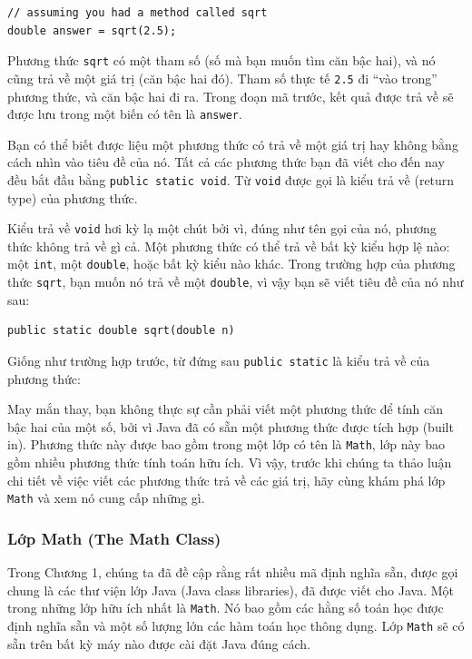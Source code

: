 \begin{verbatim}
// assuming you had a method called sqrt
double answer = sqrt(2.5);
\end{verbatim}

Phương thức \texttt{sqrt} có một tham số (số mà bạn muốn tìm căn bậc
hai), và nó cũng trả về một giá trị (căn bậc hai đó). Tham số thực tế
\texttt{2.5} đi ``vào trong'' phương thức, và căn bậc hai đi ra. Trong
đoạn mã trước, kết quả được trả về sẽ được lưu trong một biến có tên là
\texttt{answer}.

Bạn có thể biết được liệu một phương thức có trả về một giá trị hay
không bằng cách nhìn vào tiêu đề của nó. Tất cả các phương thức bạn đã
viết cho đến nay đều bắt đầu bằng \texttt{public\ static\ void}. Từ
\texttt{void} được gọi là kiểu trả về (return type) của phương thức.

Kiểu trả về \texttt{void} hơi kỳ lạ một chút bởi vì, đúng như tên gọi
của nó, phương thức không trả về gì cả. Một phương thức có thể trả về
bất kỳ kiểu hợp lệ nào: một \texttt{int}, một \texttt{double}, hoặc bất
kỳ kiểu nào khác. Trong trường hợp của phương thức \texttt{sqrt}, bạn
muốn nó trả về một \texttt{double}, vì vậy bạn sẽ viết tiêu đề của nó
như sau:

\begin{verbatim}
public static double sqrt(double n)
\end{verbatim}

Giống như trường hợp trước, từ đứng sau \texttt{public\ static} là kiểu
trả về của phương thức:

May mắn thay, bạn không thực sự cần phải viết một phương thức để tính
căn bậc hai của một số, bởi vì Java đã có sẵn một phương thức được tích
hợp (built in). Phương thức này được bao gồm trong một lớp có tên là
\texttt{Math}, lớp này bao gồm nhiều phương thức tính toán hữu ích. Vì
vậy, trước khi chúng ta thảo luận chi tiết về việc viết các phương thức
trả về các giá trị, hãy cùng khám phá lớp \texttt{Math} và xem nó cung
cấp những gì.

\subsubsection{Lớp Math (The Math
Class)}\label{lux1edbp-math-the-math-class}

Trong Chương 1, chúng ta đã đề cập rằng rất nhiều mã định nghĩa sẵn,
được gọi chung là các thư viện lớp Java (Java class libraries), đã được
viết cho Java. Một trong những lớp hữu ích nhất là \texttt{Math}. Nó bao
gồm các hằng số toán học được định nghĩa sẵn và một số lượng lớn các hàm
toán học thông dụng. Lớp \texttt{Math} sẽ có sẵn trên bất kỳ máy nào
được cài đặt Java đúng cách.

